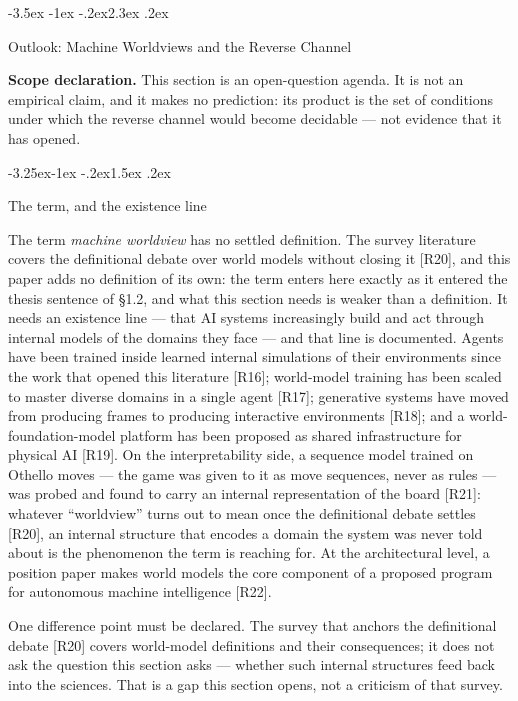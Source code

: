 \documentclass[11pt,a4paper]{article}
\makeatletter
\renewcommand\section{\@startsection{section}{1}{\z@}%
  {-3.5ex \@plus -1ex \@minus -.2ex}{2.3ex \@plus .2ex}%
  {\normalfont\Large\bfseries\raggedright}}
\renewcommand\subsection{\@startsection{subsection}{2}{\z@}%
  {-3.25ex\@plus -1ex \@minus -.2ex}{1.5ex \@plus .2ex}%
  {\normalfont\large\bfseries\raggedright}}
\makeatother
\begin{document}
\section{Outlook: Machine Worldviews and the Reverse Channel}

\textbf{Scope declaration.} This section is an open-question agenda. It is not an empirical claim, and it makes no prediction: its product is the set of conditions under which the reverse channel would become decidable — not evidence that it has opened.

\subsection{The term, and the existence line}

The term \textit{machine worldview} has no settled definition. The survey literature covers the definitional debate over world models without closing it [R20], and this paper adds no definition of its own: the term enters here exactly as it entered the thesis sentence of §1.2, and what this section needs is weaker than a definition. It needs an existence line — that AI systems increasingly build and act through internal models of the domains they face — and that line is documented. Agents have been trained inside learned internal simulations of their environments since the work that opened this literature [R16]; world-model training has been scaled to master diverse domains in a single agent [R17]; generative systems have moved from producing frames to producing interactive environments [R18]; and a world-foundation-model platform has been proposed as shared infrastructure for physical AI [R19]. On the interpretability side, a sequence model trained on Othello moves — the game was given to it as move sequences, never as rules — was probed and found to carry an internal representation of the board [R21]: whatever ``worldview'' turns out to mean once the definitional debate settles [R20], an internal structure that encodes a domain the system was never told about is the phenomenon the term is reaching for. At the architectural level, a position paper makes world models the core component of a proposed program for autonomous machine intelligence [R22].

One difference point must be declared. The survey that anchors the definitional debate [R20] covers world-model definitions and their consequences; it does not ask the question this section asks — whether such internal structures feed back into the sciences. That is a gap this section opens, not a criticism of that survey.
\end{document}
